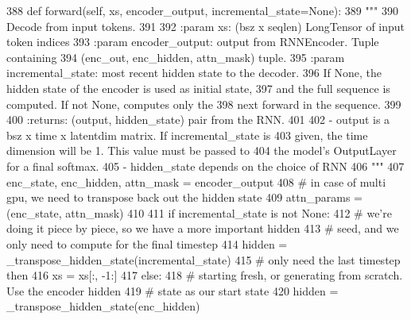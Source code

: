 \begin{DoxyCode}
388     \textcolor{keyword}{def }forward(self, xs, encoder\_output, incremental\_state=None):
389         \textcolor{stringliteral}{"""}
390 \textcolor{stringliteral}{        Decode from input tokens.}
391 \textcolor{stringliteral}{}
392 \textcolor{stringliteral}{        :param xs: (bsz x seqlen) LongTensor of input token indices}
393 \textcolor{stringliteral}{        :param encoder\_output: output from RNNEncoder. Tuple containing}
394 \textcolor{stringliteral}{            (enc\_out, enc\_hidden, attn\_mask) tuple.}
395 \textcolor{stringliteral}{        :param incremental\_state: most recent hidden state to the decoder.}
396 \textcolor{stringliteral}{            If None, the hidden state of the encoder is used as initial state,}
397 \textcolor{stringliteral}{            and the full sequence is computed. If not None, computes only the}
398 \textcolor{stringliteral}{            next forward in the sequence.}
399 \textcolor{stringliteral}{}
400 \textcolor{stringliteral}{        :returns: (output, hidden\_state) pair from the RNN.}
401 \textcolor{stringliteral}{}
402 \textcolor{stringliteral}{            - output is a bsz x time x latentdim matrix. If incremental\_state is}
403 \textcolor{stringliteral}{                given, the time dimension will be 1. This value must be passed to}
404 \textcolor{stringliteral}{                the model's OutputLayer for a final softmax.}
405 \textcolor{stringliteral}{            - hidden\_state depends on the choice of RNN}
406 \textcolor{stringliteral}{        """}
407         enc\_state, enc\_hidden, attn\_mask = encoder\_output
408         \textcolor{comment}{# in case of multi gpu, we need to transpose back out the hidden state}
409         attn\_params = (enc\_state, attn\_mask)
410 
411         \textcolor{keywordflow}{if} incremental\_state \textcolor{keywordflow}{is} \textcolor{keywordflow}{not} \textcolor{keywordtype}{None}:
412             \textcolor{comment}{# we're doing it piece by piece, so we have a more important hidden}
413             \textcolor{comment}{# seed, and we only need to compute for the final timestep}
414             hidden = \_transpose\_hidden\_state(incremental\_state)
415             \textcolor{comment}{# only need the last timestep then}
416             xs = xs[:, -1:]
417         \textcolor{keywordflow}{else}:
418             \textcolor{comment}{# starting fresh, or generating from scratch. Use the encoder hidden}
419             \textcolor{comment}{# state as our start state}
420             hidden = \_transpose\_hidden\_state(enc\_hidden)

\end{DoxyCode}
